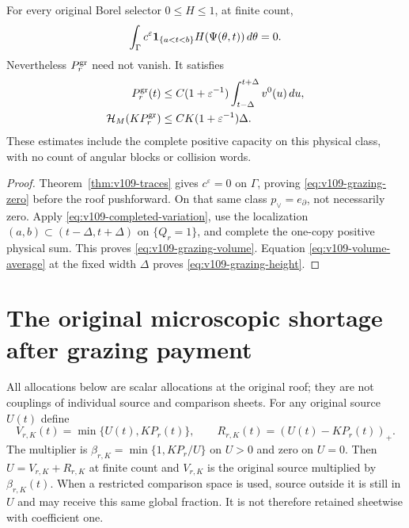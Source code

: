 \begin{theorem}
\label{thm:v109-grazing}
For every original Borel selector $0\leq H\leq1$, at finite count,
\begin{equation}\label{eq:v109-grazing-zero}
 \int_\Gamma c^\varepsilon\mathbf1_{\{a<t<b\}}
                  H(\Psi(\theta,t))\,d\theta=0.
\end{equation}
Nevertheless $P_r^{\rm gr}$ need not vanish. It satisfies
\begin{align}
 P_r^{\rm gr}(t)&\leq C(1+\varepsilon^{-1})
                         \int_{t-\Delta}^{t+\Delta}v^0(u)\,du,
                         \label{eq:v109-grazing-volume}\\
 \mathcal H_M(KP_r^{\rm gr})&\leq
                       CK(1+\varepsilon^{-1})\Delta.
                         \label{eq:v109-grazing-height}
\end{align}
These estimates include the complete positive capacity on this
physical class, with no count of angular blocks or collision words.
\end{theorem}
\begin{proof}
Theorem~\ref{thm:v109-traces} gives $c^\varepsilon=0$ on $\Gamma$,
proving \eqref{eq:v109-grazing-zero} before the roof pushforward.
On that same class $p_\vee=e_\partial$, not necessarily zero.
Apply \eqref{eq:v109-completed-variation}, use the localization
$(a,b)\subset(t-\Delta,t+\Delta)$ on $\{Q_r=1\}$, and complete
the one-copy positive physical sum. This proves
\eqref{eq:v109-grazing-volume}. Equation
\eqref{eq:v109-volume-average} at the fixed width $\Delta$ proves
\eqref{eq:v109-grazing-height}.
\end{proof}

\section{The original microscopic shortage after grazing payment}
\label{sec:v109-shortage}
All allocations below are scalar allocations at the original roof;
they are not couplings of individual source and comparison sheets.
For any original source $U(t)$ define
\[
 V_{r,K}(t)=\min\{U(t),KP_r(t)\},\qquad
 R_{r,K}(t)=(U(t)-KP_r(t))_+.
\]
The multiplier is $\beta_{r,K}=\min\{1,KP_r/U\}$ on $U>0$ and
zero on $U=0$. Then $U=V_{r,K}+R_{r,K}$ at finite count and
$V_{r,K}$ is the original source multiplied by $\beta_{r,K}(t)$.
When a restricted comparison space is used, source outside it is
still in $U$ and may receive this same global fraction. It is not
therefore retained sheetwise with coefficient one.

